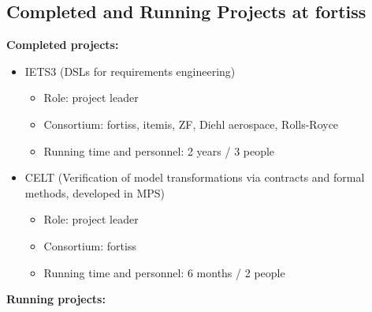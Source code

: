 \documentclass{scrartcl}
\begin{document}
\begin{appendices}
\section{Completed and Running Projects at fortiss}
\label{app:projects}

\textbf{Completed projects:}

\begin{itemize}
  \item IETS3 (DSLs for requirements engineering)
  \begin{itemize}
    \item Role: project leader
    \item Consortium: fortiss, itemis, ZF, Diehl aerospace, Rolls-Royce
    \item Running time and personnel: 2 years / 3 people
  \end{itemize}
  \item CELT (Verification of model transformations via contracts and formal
  methods, developed in MPS)
  \begin{itemize}
    \item Role: project leader
    \item Consortium: fortiss
    \item Running time and personnel: 6 months / 2 people
  \end{itemize}
\end{itemize}

\textbf{Running  projects:}


\end{appendices}
\end{document}
